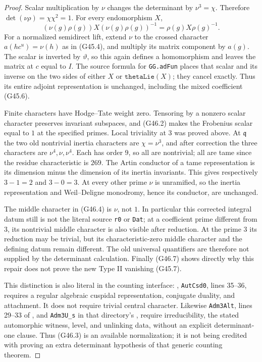 \begin{proof}
Scalar multiplication by $\nu$ changes the determinant by
$\nu^3=\chi$.  Therefore
$\det(\nu\rho)=\chi\chi^2=1$.
For every endomorphism $X$,
\[
       (\nu(g)\rho(g))X(\nu(g)\rho(g))^{-1}
                    =\rho(g)X\rho(g)^{-1}.             \tag{G46.7}
\]
For a normalized semidirect lift, extend $\nu$ to the
crossed character $a(hc^u)=\nu(h)$ as in (G45.4), and
multiply its matrix component by $a(g)$.
The scalar is inverted by $\vartheta$, so this again defines
a homomorphism and leaves the matrix at $c$ equal to $I$.
The source formula for \texttt{GG.adFun} places that scalar
and its inverse on the two sides of either $X$ or
$\texttt{thetaLie}(X)$; they cancel exactly.  Thus its
entire adjoint representation is unchanged, including the
mixed coefficient (G45.6).

Finite characters have Hodge--Tate weight zero.  Tensoring by
a nonzero scalar character preserves invariant subspaces,
and (G46.2) makes the Frobenius scalar equal to $1$ at the
specified primes.  Local triviality at $3$ was proved above.
At $\mathfrak q$ the two old nontrivial inertia characters
are $\chi=\nu^3$, and after correction the three characters
are $\nu^4,\nu,\nu^4$.  Each has order $9$, so all are
nontrivial; all are tame since the residue characteristic is
$269$.  The Artin conductor of a tame representation is its
dimension minus the dimension of its inertia invariants.
This gives respectively $3-1=2$ and $3-0=3$.
At every other prime $\nu$ is unramified, so the inertia
representation and Weil--Deligne monodromy, hence its conductor,
are unchanged.

The middle character in (G46.4) is $\nu$, not $1$.
In particular this corrected integral datum still is not the
literal source \texttt{r0} or \texttt{Dat}; at a coefficient
prime different from $3$, its nontrivial middle character is
also visible after reduction.  At the prime $3$ its reduction
may be trivial, but its characteristic-zero middle character
and the defining datum remain different.  The old universal
quantifiers are therefore not supplied by the determinant
calculation.  Finally (G46.7) shows directly why this repair
does not prove the new Type II vanishing (G45.7).

This distinction is also literal in the counting interface:
,
\texttt{AutCsd0}, lines 35--36, requires a regular algebraic
cuspidal representation, conjugate duality, and attachment.
It does not require trivial central character.  Likewise
\texttt{Adm3Alt}, lines 29--33 of
,
and \texttt{Adm3U\_s} in that directory's
, require irreducibility, the stated
automorphic witness, level, and unlinking data, without an
explicit determinant-one clause.  Thus (G46.3) is an available
normalization; it is not being credited with proving an extra
determinant hypothesis of that generic counting theorem.
\end{proof}

